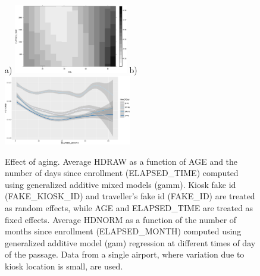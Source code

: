 \documentclass{cta-author}%
\begin{document}
\begin{figure} [!b] 
\centering
a) \includegraphics[width=0.5\linewidth,height=1.2in]{eps/HDNORMvsAGE-ELAPSED(inverted).eps}  
b)
\includegraphics[width=0.45\linewidth,height=1.2in]{eps/HDNORM=F(ELAPSE,hh)-PORT=A.eps} 

\caption{Effect of aging. 
 { 
Average HDRAW as a function of AGE and the number of days since enrollment (ELAPSED\_TIME) computed using generalized additive mixed models (gamm).  
Kiosk fake id (FAKE\_KIOSK\_ID) and traveller's fake id (FAKE\_ID) are treated as random effects, while AGE and ELAPSED\_TIME are treated as fixed effects.
}
 {  Average HDNORM as a function of the number of months since enrollment (ELAPSED\_MONTH) computed  using generalized additive model (gam) regression  at different times of day of the passage. Data from a single airport, where variation due to kiosk location is small, are used.
}
\label{fAgingHH}}
\end{figure}
\end{document}
